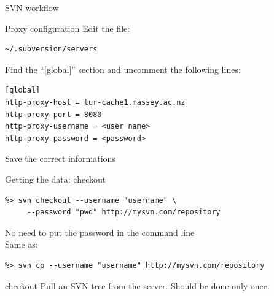 \documentclass[12pt]{beamer}
\begin{document}

\begin{frame}
	\begin{block}{SVN workflow}
	\end{block}
\end{frame}

\begin{frame}[fragile]
	\begin{block}{Proxy configuration}
		Edit the file:
		\begin{verbatim}
~/.subversion/servers
		\end{verbatim}
		Find the ``[global]'' section and uncomment the following lines:
		\begin{verbatim}
[global]
http-proxy-host = tur-cache1.massey.ac.nz
http-proxy-port = 8080
http-proxy-username = <user name>
http-proxy-password = <password>
		\end{verbatim}
Save the correct informations
	\end{block}
\end{frame}

\begin{frame}[fragile]
	\begin{block}{Getting the data: checkout}
		\begin{verbatim}
%> svn checkout --username "username" \
	 --password "pwd" http://mysvn.com/repository
		\end{verbatim}
		No need to put the password in the command line\\
		Same as:
		\begin{verbatim}
%> svn co --username "username" http://mysvn.com/repository
		\end{verbatim}
	\end{block}
	\begin{exampleblock}{checkout}
		 Pull an SVN tree from the server. Should be done only once.
	\end{exampleblock}
\end{frame}
\end{document}
